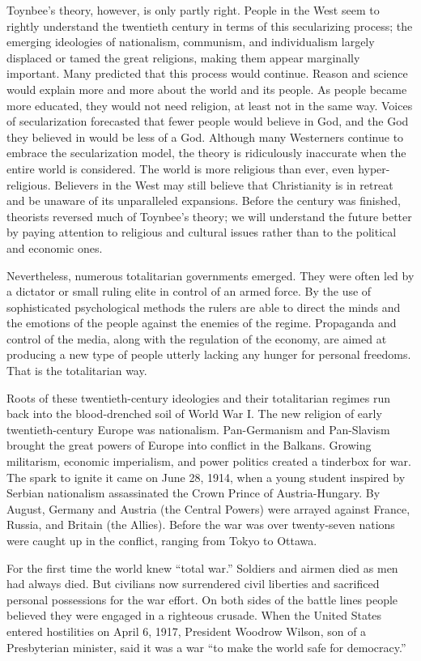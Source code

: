 Toynbee’s theory, however, is only partly right. People in the West seem to rightly understand the
twentieth century in terms of this secularizing process; the emerging ideologies of nationalism,
communism, and individualism largely displaced or tamed the great religions, making them appear
marginally important. Many predicted that this process would continue. Reason and science would
explain more and more about the world and its people. As people became more educated, they would not
need religion, at least not in the same way. Voices of secularization forecasted that fewer people
would believe in God, and the God they believed in would be less of a God. Although many Westerners
continue to embrace the secularization model, the theory is ridiculously inaccurate when the entire
world is considered. The world is more religious than ever, even hyper-religious. Believers in the
West may still believe that Christianity is in retreat and be unaware of its unparalleled
expansions. Before the century was finished, theorists reversed much of Toynbee’s theory; we will
understand the future better by paying attention to religious and cultural issues rather than to the
political and economic ones.

Nevertheless, numerous totalitarian governments emerged. They were often led by a dictator or small
ruling elite in control of an armed force. By the use of sophisticated psychological methods the
rulers are able to direct the minds and the emotions of the people against the enemies of the
regime. Propaganda and control of the media, along with the regulation of the economy, are aimed at
producing a new type of people utterly lacking any hunger for personal freedoms. That is the
totalitarian way.

Roots of these twentieth-century ideologies and their totalitarian regimes run back into the
blood-drenched soil of World War I. The new religion of early twentieth-century Europe was
nationalism. Pan-Germanism and Pan-Slavism brought the great powers of Europe into conflict in the
Balkans. Growing militarism, economic imperialism, and power politics created a tinderbox for war.
The spark to ignite it came on June 28, 1914, when a young student inspired by Serbian nationalism
assassinated the Crown Prince of Austria-Hungary. By August, Germany and Austria (the Central
Powers) were arrayed against France, Russia, and Britain (the Allies). Before the war was over
twenty-seven nations were caught up in the conflict, ranging from Tokyo to Ottawa.

For the first time the world knew “total war.” Soldiers and airmen died as men had always died. But
civilians now surrendered civil liberties and sacrificed personal possessions for the war effort. On
both sides of the battle lines people believed they were engaged in a righteous crusade. When the
United States entered hostilities on April 6, 1917, President Woodrow Wilson, son of a Presbyterian
minister, said it was a war “to make the world safe for democracy.”

